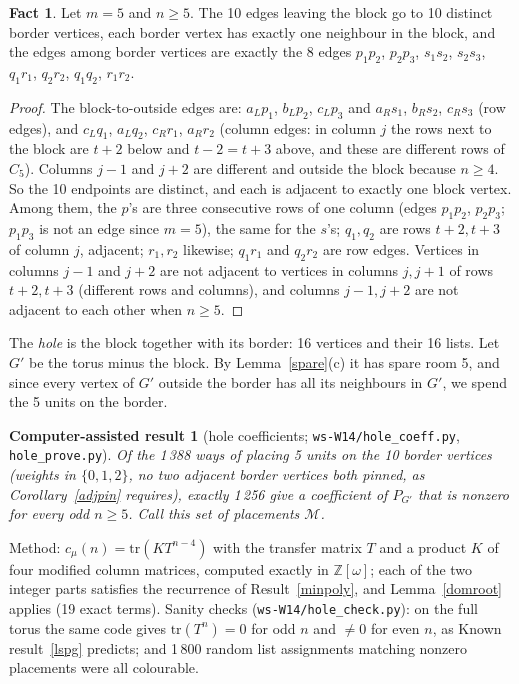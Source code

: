 \documentclass[11pt]{article}
\theoremstyle{plain}
\newtheorem{computed}[theorem]{Computer-assisted result}
\theoremstyle{definition}
\newtheorem{fact}[theorem]{Fact}
\theoremstyle{remark}
\newcommand{\Z}{\mathbb{Z}}
\newcommand{\script}[1]{\texttt{#1}}
\begin{document}
\begin{fact}\label{borderfact}
Let $m = 5$ and $n \ge 5$. The 10 edges leaving the block go to 10 distinct border vertices, each border vertex has exactly
one neighbour in the block, and the edges among border vertices are exactly the 8 edges $p_1p_2$, $p_2p_3$, $s_1s_2$,
$s_2s_3$, $q_1r_1$, $q_2r_2$, $q_1q_2$, $r_1r_2$.
\end{fact}

\begin{proof}
The block-to-outside edges are: $a_L p_1$, $b_L p_2$, $c_L p_3$ and $a_R s_1$, $b_R s_2$, $c_R s_3$ (row edges), and
$c_L q_1$, $a_L q_2$, $c_R r_1$, $a_R r_2$ (column edges: in column $j$ the rows next to the block are $t + 2$ below and
$t - 2 = t + 3$ above, and these are different rows of $C_5$). Columns $j - 1$ and $j + 2$ are different and outside the
block because $n \ge 4$. So the 10 endpoints are distinct, and each is adjacent to exactly one block vertex. Among them,
the $p$'s are three consecutive rows of one column (edges $p_1p_2$, $p_2p_3$; $p_1p_3$ is not an edge since $m = 5$), the
same for the $s$'s; $q_1, q_2$ are rows $t+2, t+3$ of column $j$, adjacent; $r_1, r_2$ likewise; $q_1 r_1$ and $q_2 r_2$ are
row edges. Vertices in columns $j-1$ and $j+2$ are not adjacent to vertices in columns $j, j+1$ of rows $t+2, t+3$ (different
rows and columns), and columns $j - 1, j + 2$ are not adjacent to each other when $n \ge 5$.
\end{proof}

The \emph{hole} is the block together with its border: 16 vertices and their 16 lists. Let $G'$ be the torus minus the
block. By Lemma~\ref{spare}(c) it has spare room 5, and since every vertex of $G'$ outside the border has all its neighbours
in $G'$, we spend the 5 units on the border.

\begin{computed}[hole coefficients; \script{ws-W14/hole\_coeff.py}, \script{hole\_prove.py}]\label{holecoef}
Of the 1\,388 ways of placing 5 units on the 10 border vertices (weights in $\{0,1,2\}$, no two adjacent border vertices both
pinned, as Corollary~\ref{adjpin} requires), exactly 1\,256 give a coefficient of $P_{G'}$ that is nonzero for \emph{every} odd
$n \ge 5$. Call this set of placements $\mathcal{M}$.
\end{computed}

Method: $c_\mu(n) = \mathrm{tr}(K T^{n-4})$ with the transfer matrix $T$ and a product $K$ of four modified column matrices,
computed exactly in $\Z[\omega]$; each of the two integer parts satisfies the recurrence of Result~\ref{minpoly}, and
Lemma~\ref{domroot} applies (19 exact terms). Sanity checks (\script{ws-W14/hole\_check.py}): on the full torus the same code gives
$\mathrm{tr}(T^n) = 0$ for odd $n$ and $\ne 0$ for even $n$, as Known result~\ref{lspg} predicts; and 1\,800 random list
assignments matching nonzero placements were all colourable.
\end{document}
